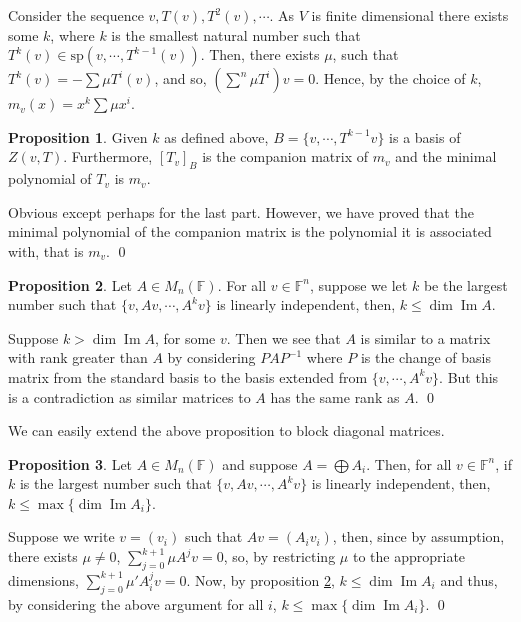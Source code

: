 \documentclass[
]{article}
\theoremstyle{definition}
\newtheorem{prop}{Proposition}[section]
\theoremstyle{definition}
\begin{document}
Consider the sequence \(v, T(v), T^2(v), \cdots\). As \(V\) is finite
dimensional there exists some \(k\), where \(k\) is the smallest natural
number such that \(T^k(v) \in \text{sp}(v, \cdots, T^{k - 1}(v))\).
Then, there exists \(\mu\), such that \(T^k(v) = - \sum \mu T^i(v)\),
and so, \((\sum^n \mu T^i)v = 0\). Hence, by the choice of \(k\),
\(m_v(x) = x^k \sum \mu x^i\).

\begin{prop}\label{annihilator}
  Given \(k\) as defined above, \(B = \{v, \cdots, T^{k - 1}v\}\) is a basis 
  of \(Z(v, T)\). Furthermore, \([T_v]_B\) is the companion matrix of \(m_v\) and 
  the minimal polynomial of \(T_v\) is \(m_v\).
\end{prop}
\proof

Obvious except perhaps for the last part. However, we have proved that
the minimal polynomial of the companion matrix is the polynomial it is
associated with, that is \(m_v\). \qed

\begin{prop}\label{max_cyclic}
  Let \(A \in M_n (\mathbb{F})\). For all \(v \in \mathbb{F}^n\), suppose we 
  let \(k\) be the largest number such that \(\{v, Av, \cdots, A^kv\}\) is 
  linearly independent, then, \(k \le \dim \mathop{\mathrm{Im}}A\).
\end{prop}
\proof

Suppose \(k > \dim \mathop{\mathrm{Im}}A\), for some \(v\). Then we see
that \(A\) is similar to a matrix with rank greater than \(A\) by
considering \(PAP^{-1}\) where \(P\) is the change of basis matrix from
the standard basis to the basis extended from \(\{v, \cdots, A^kv\}\).
But this is a contradiction as similar matrices to \(A\) has the same
rank as \(A\). \qed

We can easily extend the above proposition to block diagonal matrices.

\begin{prop}
  Let \(A \in M_n (\mathbb{F})\) and suppose \(A = \bigoplus A_i\). 
  Then, for all \(v \in \mathbb{F}^n\), if \(k\) is the largest number such that 
  \(\{v, Av, \cdots, A^kv\}\) is linearly independent, then, 
  \(k \le \max \{\dim \mathop{\mathrm{Im}}A_i\}\).
\end{prop}
\proof

Suppose we write \(v = (v_i)\) such that \(Av = (A_i v_i)\), then, since
by assumption, there exists \(\mu \neq 0\),
\(\sum_{j = 0}^{k + 1} \mu A^j v = 0\), so, by restricting \(\mu\) to
the appropriate dimensions, \(\sum_{j = 0}^{k + 1} \mu' A_i^j v = 0\).
Now, by proposition \ref{max_cyclic},
\(k \le \dim \mathop{\mathrm{Im}}A_i\) and thus, by considering the
above argument for all \(i\),
\(k \le \max \{\dim \mathop{\mathrm{Im}}A_i\}\). \qed
\end{document}

